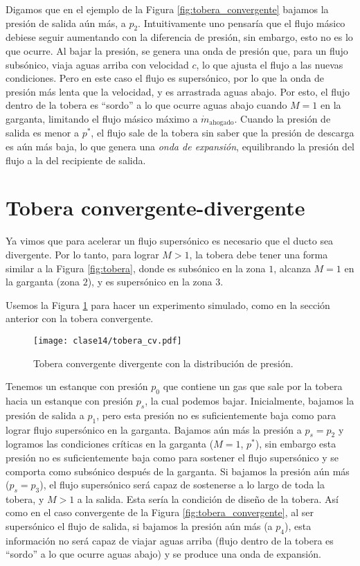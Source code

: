 Digamos que en el ejemplo de la Figura \ref{fig:tobera_convergente} bajamos la presión de salida aún más, a $p_2$.
Intuitivamente uno pensaría que el flujo másico debiese seguir aumentando con la diferencia de presión, sin embargo, esto no es lo que ocurre.
Al bajar la presión, se genera una onda de presión que, para un flujo subsónico, viaja aguas arriba con velocidad $c$, lo que ajusta el flujo a las nuevas condiciones.
Pero en este caso el flujo es supersónico, por lo que la onda de presión más lenta que la velocidad, y es arrastrada aguas abajo.
Por esto, el flujo dentro de la tobera es ``sordo'' a lo que ocurre aguas abajo cuando $M=1$ en la garganta, limitando el flujo másico máximo a $\dot{m}_\text{ahogado}$.
Cuando la presión de salida es menor a $p^*$, el flujo sale de la tobera sin saber que la presión de descarga es aún más baja, lo que genera una \emph{onda de expansión}, equilibrando la presión del flujo a la del recipiente de salida.

\section*{Tobera convergente-divergente}

Ya vimos que para acelerar un flujo supersónico es necesario que el ducto sea divergente.
Por lo tanto, para lograr $M>1$, la tobera debe tener una forma similar a la Figura \ref{fig:tobera}, donde es subsónico en la zona $1$, alcanza $M=1$ en la garganta (zona $2$), y es supersónico en la zona $3$.

Usemos la Figura \ref{fig:tobera_cv} para hacer un experimento simulado, como en la sección anterior con la tobera convergente.
%
\begin{figure}
\centering
\texttt{[image: clase14/tobera\_cv.pdf]}
\caption{Tobera convergente divergente con la distribución de presión.}
\label{fig:tobera_cv}
\end{figure}
%
Tenemos un estanque con presión $p_0$ que contiene un gas que sale por la tobera hacia un estanque con presión $p_s$, la cual podemos bajar.
Inicialmente, bajamos la presión de salida a $p_1$, pero esta presión no es suficientemente baja como para lograr flujo supersónico en la garganta.
Bajamos aún más la presión a $p_s=p_2$ y logramos las condiciones críticas en la garganta ($M=1$, $p^*$), sin embargo esta presión no es suficientemente baja como para sostener el flujo supersónico y se comporta como subsónico después de la garganta.
Si bajamos la presión aún más ($p_s=p_3$), el flujo supersónico será capaz de sostenerse a lo largo de toda la tobera, y $M>1$ a la salida.
Esta sería la condición de diseño de la tobera.
Así como en el caso convergente de la Figura \ref{fig:tobera_convergente}, al ser supersónico el flujo de salida, si bajamos la presión aún más (a $p_4$), esta información no será capaz de viajar aguas arriba (flujo dentro de la tobera es ``sordo'' a lo que ocurre aguas abajo) y se produce una onda de expansión.

